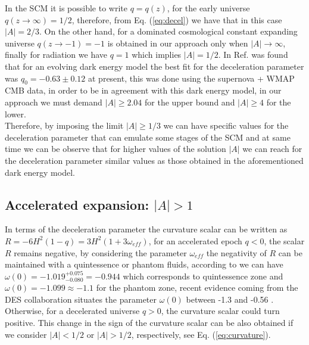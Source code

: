\documentclass[twocolumn,showpacs,nofootinbib,floats,amsmath,amssymb]{revtex4}
\begin{document}
In the SCM it is possible to write $q = q(z)$, for the early universe $q(z\rightarrow \infty) = 1/2$, therefore, from Eq. (\ref{eq:decel}) we have that in this case $\left|A\right| = 2/3$. On the other hand, for a dominated cosmological constant expanding universe $q(z\rightarrow -1) = -1$ is obtained in our approach only when $\left|A\right| \rightarrow \infty$, finally for radiation we have $q = 1$ which implies $\left|A\right| = 1/2$. In Ref. \cite{staro} was found that for an evolving dark energy model the best fit for the deceleration parameter was $q_{0} = -0.63 \pm 0.12$ at present, this was done using the supernova + WMAP CMB data, in order to be in agreement with this dark energy model, in our approach we must demand $\left|A \right| \geq 2.04$ for the upper bound and $\left|A \right| \geq 4$ for the lower.\\ Therefore, by imposing the limit $\left|A\right| \geq 1/3$ we can have specific values for the deceleration parameter that can emulate some stages of the SCM and at same time we can be observe that for higher values of the solution $\left|A\right|$ we can reach for the deceleration parameter similar values as those obtained in the aforementioned dark energy model.

\subsection{Accelerated expansion: $\left|A\right| > 1$}
In terms of the deceleration parameter the curvature scalar can be written as $R = -6H^{2}(1-q) = 3H^{2}(1+3\omega_{eff})$, for an accelerated epoch $q < 0$, the scalar $R$ remains negative, by considering the parameter $\omega_{eff}$ the negativity of $R$ can be maintained with a quintessence or phantom fluids, according to \cite{wmap} we can have $\omega(0)=-1.019_{-0.080}^{+0.075} = -0.944$ which corresponds to quintessence zone and $\omega(0) = -1.099 \approx -1.1$ for the phantom zone, recent evidence coming from the DES collaboration situates the parameter $\omega(0)$ between -1.3 and -0.56 \cite{des}. Otherwise, for a decelerated universe $q > 0$, the curvature scalar could turn positive. This change in the sign of the curvature scalar can be also obtained if we consider $\left|A\right| < 1/2$ or $\left|A\right| > 1/2$, respectively, see Eq. (\ref{eq:curvature}).\\
  
\end{document}
